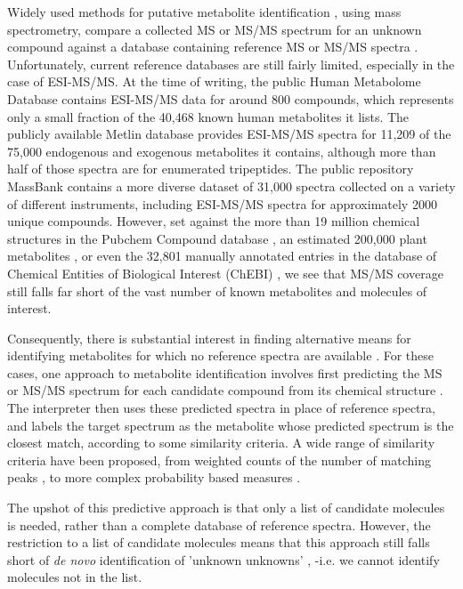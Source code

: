 Widely used methods for putative metabolite identification \citep{Sumner2007}, using mass spectrometry, compare a collected MS or MS/MS spectrum for an unknown compound against a database containing reference MS or MS/MS spectra \citep{Stein1994, Scheubert2013, Tautenhahn2012}. 
Unfortunately, current reference databases are still fairly limited, especially in the case of ESI-MS/MS. At the time of writing, the public Human Metabolome Database \citep{Wishart2013} contains ESI-MS/MS data for around 800 compounds, which represents only a small fraction of the 40,468 known human metabolites it lists. The publicly available Metlin database \citep{Smith2005} provides ESI-MS/MS spectra for 11,209 of the 75,000 endogenous and exogenous metabolites it contains, although more than half of those spectra are for enumerated tripeptides. The public repository MassBank \citep{Horai2010} contains a more diverse dataset of 31,000 spectra collected on a variety of different instruments, including ESI-MS/MS spectra for approximately 2000 unique compounds. 
However, set against the more than 19 million chemical structures in the Pubchem Compound database \citep{Bolton2008}, an estimated 200,000 plant metabolites \citep{Fiehn2002}, or even the 32,801 manually annotated entries in the database of Chemical Entities of Biological Interest (ChEBI) \citep{Hastings2013}, we see that MS/MS coverage still falls far short of the vast number of known metabolites and molecules of interest. 

Consequently, there is substantial interest in finding alternative means for identifying metabolites for which no reference spectra are available \citep{Scheubert2013}.
For these cases, one approach to metabolite identification involves first predicting the MS or MS/MS spectrum for each candidate compound from its chemical structure \citep{Kokkonen2008, Wolf2010, Lindsay1980, Gasteiger1992}. 
The interpreter then uses these predicted spectra in place of reference spectra, and labels the target spectrum as the metabolite whose predicted spectrum is the closest match, according to some similarity criteria. 
A wide range of similarity criteria have been proposed, from weighted counts of the number of matching peaks \citep{Stein1994}, to more complex probability based measures \citep{Mylonas2009, Oberacher2009}.

The upshot of this predictive approach is that only a list of candidate molecules is needed, rather than a complete database of reference spectra. 
However, the restriction to a list of candidate molecules means that this approach still falls short of \emph{de novo} identification of 'unknown unknowns' \citep{Wishart2009}, -i.e. we cannot identify molecules not in the list. 


